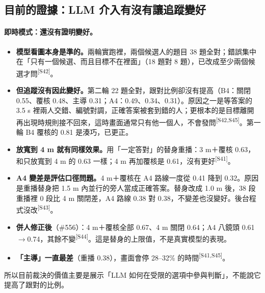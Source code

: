 \documentclass[11pt,a4paper]{article}
\newcommand{\src}[1]{\textsuperscript{\scriptsize[#1]}}
\begin{document}
\subsection{目前的證據：LLM 介入有沒有讓追蹤變好}\label{sec:v4-evidence}

\paragraph{即時模式：還沒有證明變好。}
\begin{itemize}
  \item \textbf{模型看圖本身是準的。}兩輪實跑裡，兩個候選人的題目 38 題全對；錯誤集中在「只有一個候選、而且目標不在裡面」（18 題對 8 題），已改成至少兩個候選才問\src{S42}。
  \item \textbf{但追蹤沒有因此變好。}第二輪 22 題全對，跟對比例卻沒有提高（B4：關閉 0.55、覆核 0.48、主導 0.31；A4：0.49、0.34、0.31）。原因之一是等答案的 3.5 s 裡兩人交錯、編號對調，正確答案被套到錯的人；更根本的是目標離開再出現時規則接不回來，這時畫面通常只有他一個人，不會發問\src{S42,S45}。第一輪 B4 覆核的 0.81 是湊巧，已更正。
  \item \textbf{放寬到 4 m 就有同樣效果。}用「一定答對」的替身重播：3 m＋覆核 0.63，和只放寬到 4 m 的 0.63 一樣；4 m 再加覆核是 0.61，沒有更好\src{S41}。
  \item \textbf{A4 變差是評估口徑問題。}4 m＋覆核在 A4 路線一度從 0.41 降到 0.32。原因是重播替身把 1.5 m 內並行的旁人當成正確答案。替身改成 1.0 m 後，38 段重播裡 0 段比 4 m 關閉差，A4 路線 0.38 對 0.38，不變差也沒變好。後台程式沒改\src{S43}。
  \item \textbf{併人修正後}（\#556）：4 m＋覆核全部 0.67、4 m 關閉 0.64；A4 八鏡頭 0.61$\to$0.74，其餘不變\src{S44}。這是替身的上限值，不是真實模型的表現。
  \item \textbf{「主導」一直最差}（重播 0.38），畫面會停 28--32\% 的時間\src{S41,S45}。
\end{itemize}
所以目前裁決的價值主要是展示「LLM 如何在受限的選項中參與判斷」，不能說它提高了跟對的比例。
\end{document}
